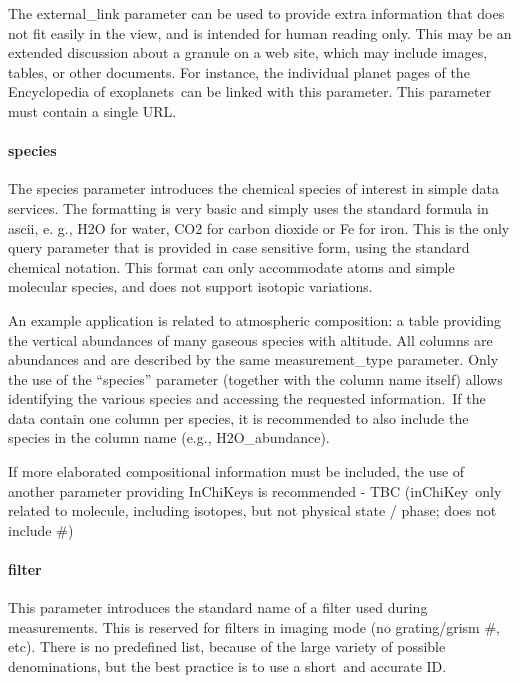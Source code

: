 \documentclass[11pt,a4paper]{ivoa}
\begin{document}
The external\_link parameter can be used to provide extra information that does not fit easily in the view, and is intended for human reading only. This may be an extended discussion about a granule on a web site, which may include images, tables, or other documents. For instance, the individual planet pages of the Encyclopedia of exoplanets can be linked with this parameter. This parameter must contain a single URL.\\

\paragraph{species}

The species parameter introduces the chemical species of interest in simple data services. The formatting is very basic and simply uses the standard formula in ascii, e. g., H2O for water, CO2 for carbon dioxide or Fe for iron. This is the only query parameter that is provided in case sensitive form, using the standard chemical notation. This format can only accommodate atoms and simple molecular species, and does not support isotopic variations.  

An example application is related to atmospheric composition: a table providing the vertical abundances of many gaseous species with altitude. All columns are abundances and are described by the same measurement\_type parameter. Only the use of the ``species'' parameter (together with the column name itself) allows identifying the various species and accessing the requested information. If the data contain one column per species, it is recommended to also include the species in the column name (e.g., H2O\_abundance). 

If more elaborated compositional information must be included, the use of another parameter providing InChiKeys is recommended - TBC (inChiKey only related to molecule, including isotopes, but not physical state / phase; does not include \#)\\

\paragraph{filter}

This parameter introduces the standard name of a filter used during measurements. This is reserved for filters in imaging mode (no grating/grism \#, etc). There is no predefined list, because of the large variety of possible denominations, but the best practice is to use a short and accurate ID. 
\end{document}
